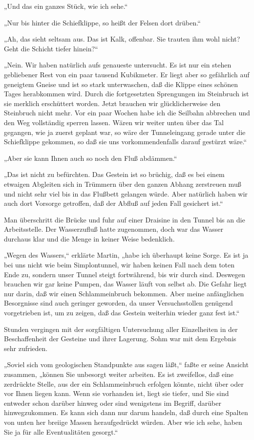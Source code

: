 „Und das ein ganzes Stück, wie ich sehe.“

„Nur bis hinter die Schiefklippe, so heißt der Felsen dort
drüben.“

„Ah, das sieht seltsam aus. Das ist Kalk, offenbar. Sie trauten ihm
wohl nicht? Geht die Schicht tiefer hinein?“

„Nein. Wir haben natürlich aufs genaueste untersucht. Es ist nur
ein stehen gebliebener Rest von ein paar tausend Kubikmeter. Er
liegt aber so gefährlich auf geneigtem Gneise und ist so stark
unterwaschen, daß die Klippe eines schönen Tages herabkommen wird.
Durch die fortgesetzten Sprengungen im Steinbruch ist sie merklich
erschüttert worden. Jetzt brauchen wir glücklicherweise den
Steinbruch nicht mehr. Vor ein paar Wochen habe ich die Seilbahn
abbrechen und den Weg vollständig sperren lassen. Wären wir weiter
unten über das Tal gegangen, wie ja zuerst geplant war, so wäre der
Tunneleingang gerade unter die Schiefklippe gekommen, so daß sie
uns vorkommendenfalls darauf gestürzt wäre.“

„Aber sie kann Ihnen auch so noch den Fluß abdämmen.“

„Das ist nicht zu befürchten. Das Gestein ist so brüchig, daß es
bei einem etwaigen Abgleiten sich in Trümmern über den ganzen
Abhang zerstreuen muß und nicht sehr viel bis in das Flußbett
gelangen würde. Aber natürlich haben wir auch dort Vorsorge
getroffen, daß der Abfluß auf jeden Fall gesichert ist.“

Man überschritt die Brücke und fuhr auf einer Draisine in den
Tunnel bis an die Arbeitsstelle. Der Wasserzufluß hatte zugenommen,
doch war das Wasser durchaus klar und die Menge in keiner Weise
bedenklich.

„Wegen des Wassers,“ erklärte Martin, „habe ich überhaupt keine
Sorge. Es ist ja bei uns nicht wie beim Simplontunnel, wir haben
keinen Fall nach dem toten Ende zu, sondern unser Tunnel steigt
fortwährend, bis wir durch sind. Deswegen brauchen wir gar keine
Pumpen, das Wasser läuft von selbst ab. Die Gefahr liegt nur darin,
daß wir einen Schlammeinbruch bekommen. Aber meine anfänglichen
Besorgnisse sind auch geringer geworden, da unser Versuchsstollen
genügend vorgetrieben ist, um zu zeigen, daß das Gestein weiterhin
wieder ganz fest ist.“

Stunden vergingen mit der sorgfältigen Untersuchung aller
Einzelheiten in der Beschaffenheit der Gesteine und ihrer Lagerung.
Sohm war mit dem Ergebnis sehr zufrieden.

„Soviel sich vom geologischen Standpunkte aus sagen läßt,“ faßte er
seine Ansicht zusammen, „können Sie unbesorgt weiter arbeiten. Es
ist zweifellos, daß eine zerdrückte Stelle, aus der ein
Schlammeinbruch erfolgen könnte, nicht über oder vor Ihnen liegen
kann. Wenn sie vorhanden ist, liegt sie tiefer, und Sie sind
entweder schon darüber hinweg oder sind wenigstens im Begriff,
darüber hinwegzukommen. Es kann sich dann nur darum handeln, daß
durch eine Spalten von unten her breiige Massen heraufgedrückt
würden. Aber wie ich sehe, haben Sie ja für alle Eventualitäten
gesorgt.“

